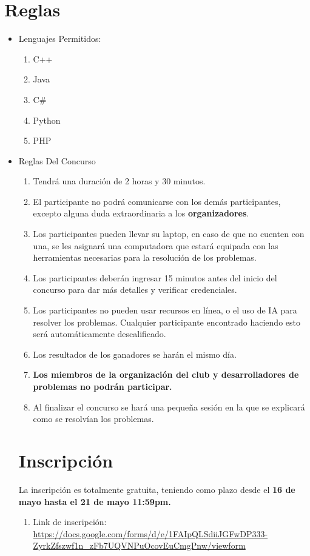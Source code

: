 \documentclass{article}
\begin{document}
\section{Reglas}
\begin{itemize}
    \item Lenguajes Permitidos:
          \begin{enumerate}
              \item C++
              \item Java
              \item C\#
              \item Python
              \item PHP
          \end{enumerate}
    \item Reglas Del Concurso
          \begin{enumerate}
              \item Tendrá una duración de 2 horas y 30 minutos.
              \item El participante no podrá comunicarse con los demás participantes, excepto alguna duda extraordinaria a los \textbf{organizadores}.
              \item Los participantes pueden llevar su laptop, en caso de que no cuenten con una, se les asignará una computadora que estará equipada con las herramientas necesarias para la resolución de los problemas.
              \item Los participantes deberán ingresar 15 minutos antes del inicio del concurso para dar más detalles y verificar credenciales.
              \item Los participantes no pueden usar recursos en línea, o el uso de IA para resolver los problemas. Cualquier participante encontrado haciendo esto será automáticamente descalificado.
              \item Los resultados de los ganadores se harán el mismo día.
              \item \textbf{Los miembros de la organización del club y desarrolladores de problemas no podrán participar.}
              \item Al finalizar el concurso se hará una pequeña sesión en la que se explicará como se resolvían los problemas.
          \end{enumerate}
          \section{Inscripción}
          La inscripción es totalmente gratuita, teniendo como plazo desde el \textbf{16 de
              mayo hasta el 21 de mayo 11:59pm.}
          \begin{enumerate}
              \item Link de inscripción: \url{https://docs.google.com/forms/d/e/1FAIpQLSdiiJGFwDP333-ZyrkZfszwf1n_zFb7UQVNPuOcovEuCmgPnw/viewform}
          \end{enumerate}

\end{itemize}
\end{document}

